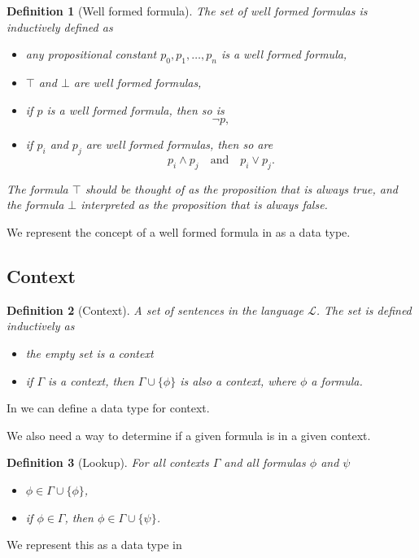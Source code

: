 \documentclass[titlepage]{article}
\newtheorem{definition}{Definition}[section]
\begin{document}
\begin{definition}[Well formed formula]
    The set of well formed formulas is inductively defined as
    \begin{itemize}
        \item any propositional constant $p_0,p_1,\hdots,p_n$ is a well formed formula,
        \item $\top$ and $\bot$ are well formed formulas,
        \item if $p$ is a well formed formula, then so is
        $$\neg p,$$
        \item if $p_i$ and $p_j$ are well formed formulas, then so are
            $$p_i \wedge p_j \quad \text{and} \quad p_i \vee p_j.$$
    \end{itemize}
    The formula $\top$ should be thought of as the proposition that is always true, and the formula $\bot$ interpreted as the proposition that is always false.
\end{definition}

We represent the concept of a well formed formula in \Agda as a data type.




\subsection{Context}

\begin{definition}[Context]
    A set of sentences in the language $\mathcal{L}$. The set is defined inductively as
    \begin{itemize}
        \item the empty set is a context
        \item if $\Gamma$ is a context, then $\Gamma \cup \{\phi\}$ is also a context, where $\phi$ a formula.
    \end{itemize}
\end{definition}

In \Agda we can define a data type for context.

We also need a way to determine if a given formula is in a given context. 
\begin{definition}[Lookup]\label{lookup}
    For all contexts $\Gamma$ and all formulas $\phi$ and $\psi$
    \begin{itemize}
        \item $\phi \in \Gamma \cup \{\phi\}$,
        \item if $\phi \in \Gamma$, then $\phi \in \Gamma \cup \{\psi\}$.
    \end{itemize}
\end{definition}
We represent this as a data type in \Agda
\end{document}
